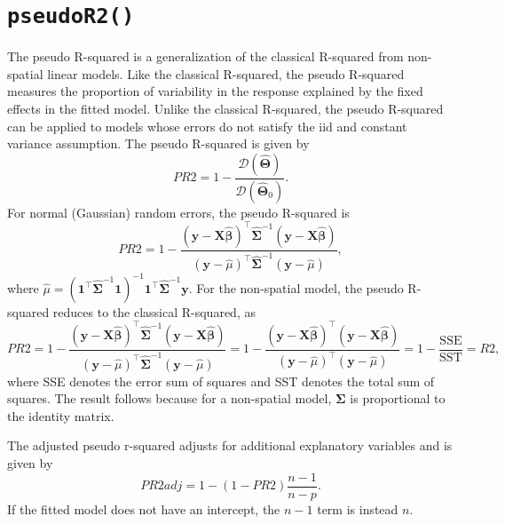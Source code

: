 \documentclass{article}
\begin{document}
\hypertarget{sec:pr2}{%
\section{\texorpdfstring{\texttt{pseudoR2()}}{pseudoR2()}}\label{sec:pr2}}

The pseudo R-squared is a generalization of the classical R-squared from
non-spatial linear models. Like the classical R-squared, the pseudo
R-squared measures the proportion of variability in the response
explained by the fixed effects in the fitted model. Unlike the classical
R-squared, the pseudo R-squared can be applied to models whose errors do
not satisfy the iid and constant variance assumption. The pseudo
R-squared is given by \begin{equation*}
PR2 = 1 - \frac{\mathcal{D}(\boldsymbol{\hat{\Theta}})}{\mathcal{D}(\boldsymbol{\hat{\Theta}}_0)}.
\end{equation*} For normal (Gaussian) random errors, the pseudo
R-squared is \begin{equation*}
PR2 = 1 - \frac{(\mathbf{y} - \mathbf{X} \hat{\boldsymbol{\beta}})^\top \hat{\boldsymbol{\Sigma}}^{-1}(\mathbf{y} - \mathbf{X} \hat{\boldsymbol{\beta}})}{(\mathbf{y} - \hat{\mu})^\top \hat{\boldsymbol{\Sigma}}^{-1}(\mathbf{y} - \hat{\mu})},
\end{equation*} where
\(\hat{\mu} = (\boldsymbol{1}^\top \hat{\boldsymbol{\Sigma}}^{-1} \boldsymbol{1})^{-1} \boldsymbol{1}^\top \hat{\boldsymbol{\Sigma}}^{-1} \mathbf{y}\).
For the non-spatial model, the pseudo R-squared reduces to the classical
R-squared, as \begin{equation*}
PR2 = 1 - \frac{(\mathbf{y} - \mathbf{X} \hat{\boldsymbol{\beta}})^\top \hat{\boldsymbol{\Sigma}}^{-1}(\mathbf{y} - \mathbf{X} \hat{\boldsymbol{\beta}})}{(\mathbf{y} - \hat{\mu})^\top \hat{\boldsymbol{\Sigma}}^{-1}(\mathbf{y} - \hat{\mu})}  = 1 - \frac{(\mathbf{y} - \mathbf{X} \hat{\boldsymbol{\beta}})^\top (\mathbf{y} - \mathbf{X} \hat{\boldsymbol{\beta}})}{(\mathbf{y} - \hat{\mu})^\top (\mathbf{y} - \hat{\mu})} = 1 - \frac{\text{SSE}}{\text{SST}} = R2,
\end{equation*} where SSE denotes the error sum of squares and SST
denotes the total sum of squares. The result follows because for a
non-spatial model, \(\boldsymbol{\Sigma}\) is proportional to the
identity matrix.

The adjusted pseudo r-squared adjusts for additional explanatory
variables and is given by \begin{equation*}
  PR2adj = 1 - (1 - PR2)\frac{n - 1}{n - p}.
\end{equation*} If the fitted model does not have an intercept, the
\(n - 1\) term is instead \(n\).
\end{document}
